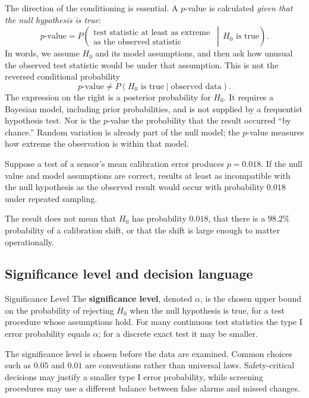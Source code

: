\FloatBarrier

The direction of the conditioning is essential. A $p$-value is calculated \emph{given that the null hypothesis is true}:
\[
p\text{-value}
=
P\!\left(
\substack{\text{test statistic at least as extreme}\\
          \text{as the observed statistic}}
\,\middle|\,
H_0\text{ is true}
\right).
\]
In words, we assume $H_0$ and its model assumptions, and then ask how unusual the observed test statistic would be under that assumption. This is not the reversed conditional probability
\[
p\text{-value}
\neq
P\!\left(H_0\text{ is true}\mid\text{observed data}\right).
\]
The expression on the right is a posterior probability for $H_0$. It requires a Bayesian model, including prior probabilities, and is not supplied by a frequentist hypothesis test. Nor is the $p$-value the probability that the result occurred ``by chance.'' Random variation is already part of the null model; the $p$-value measures how extreme the observation is within that model.

\begin{example}\par
Suppose a test of a sensor's mean calibration error produces $p=0.018$. If the null value and model assumptions are correct, results at least as incompatible with the null hypothesis as the observed result would occur with probability $0.018$ under repeated sampling.

The result does not mean that $H_0$ has probability $0.018$, that there is a $98.2\%$ probability of a calibration shift, or that the shift is large enough to matter operationally.
\end{example}

\subsection{Significance level and decision language}

\begin{definition}{Significance Level}
The \textbf{significance level}, denoted $\alpha$, is the chosen upper bound on the probability of rejecting $H_0$ when the null hypothesis is true, for a test procedure whose assumptions hold. For many continuous test statistics the type I error probability equals $\alpha$; for a discrete exact test it may be smaller.
\end{definition}

The significance level is chosen before the data are examined. Common choices such as $0.05$ and $0.01$ are conventions rather than universal laws. Safety-critical decisions may justify a smaller type I error probability, while screening procedures may use a different balance between false alarms and missed changes.

